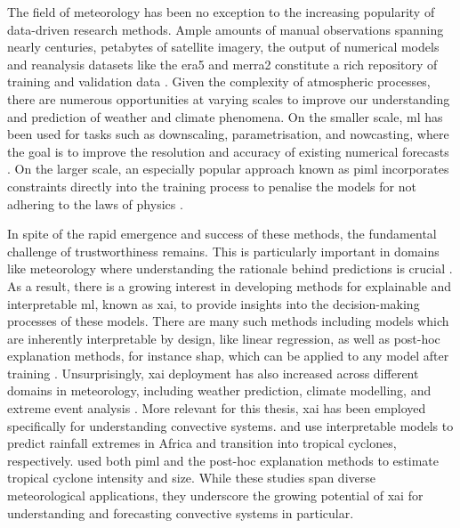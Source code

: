 The field of meteorology has been no exception to the increasing popularity of data-driven research methods. Ample amounts of manual observations spanning nearly centuries, petabytes of satellite imagery, the output of numerical models and reanalysis datasets like the \acrfull{era5} and \acrfull{merra2} constitute a rich repository of training and validation data \citep{Bracco2024,Waqas2024,Zhang2025}. Given the complexity of atmospheric processes, there are numerous opportunities at varying scales to improve our understanding and prediction of weather and climate phenomena. On the smaller scale, \acrfull{ml} has been used for tasks such as downscaling, parametrisation, and nowcasting, where the goal is to improve the resolution and accuracy of existing numerical forecasts \citep{Blunn2024,Zhang2023}. On the larger scale, an especially popular approach known as \acrfull{piml} incorporates constraints directly into the training process to penalise the models for not adhering to the laws of physics \citep{Pathak2022,Luo2025,Zhang2023}.

In spite of the rapid emergence and success of these methods, the fundamental challenge of trustworthiness remains. This is particularly important in domains like meteorology where understanding the rationale behind predictions is crucial \citep{BarredoArrieta2019,Zhang2025}. As a result, there is a growing interest in developing methods for explainable and interpretable \acrshort{ml}, known as \acrfull{xai}, to provide insights into the decision-making processes of these models. There are many such methods including models which are inherently interpretable by design, like linear regression, as well as post-hoc explanation methods, for instance \acrfull{shap}, which can be applied to any model after training \citep{BarredoArrieta2019,Molnar2025}. Unsurprisingly, \acrshort{xai} deployment has also increased across different domains in meteorology, including weather prediction, climate modelling, and extreme event analysis \citep{Mamalakis2022,Yang2024}. More relevant for this thesis, \acrshort{xai} has been employed specifically for understanding convective systems. \cite{Bassine2025} and \cite{Zhang2019} use interpretable models to predict rainfall extremes in Africa and  transition into tropical cyclones, respectively. \cite{Zhuo2021} used both \acrshort{piml} and the post-hoc explanation methods to estimate tropical cyclone intensity and size. While these studies span diverse meteorological applications, they underscore the growing potential of \acrshort{xai} for understanding and forecasting convective systems in particular.

